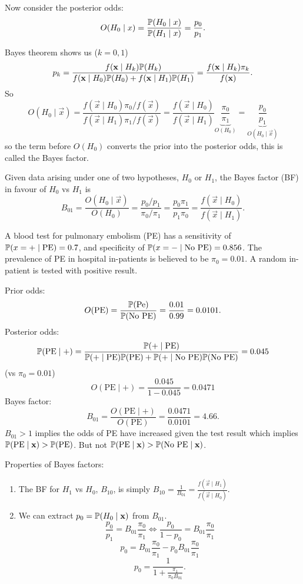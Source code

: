 \documentclass[10pt, a4paper]{article}
\begin{document}
Now consider the posterior odds:
\[
O(H_0 \mid x) = \frac{\P(H_0 \mid x)}{\P(H_1 \mid x)} = \frac{p_0}{p_1}.
\]

Bayes theorem shows us
($k = 0, 1$)
\[
p_k = \frac{f(\vec{x} \mid H_k)\P(H_k)}{f(\vec{x} \mid H_0)\P(H_0) + f(\vec{x} \mid H_1)\P(H_1)} = \frac{f(\vec{x} \mid H_k)\pi_k}{f(\vec{x})}.
\]
So
\[
O(H_0 \mid \vec{x}) = \frac{f(\vec{x} \mid H_0)\pi_0 / f(\vec{x})}{f(\vec{x} \mid H_1) \pi_1 / f(\vec{x})} = \frac{f(\vec{x} \mid H_0)}{f(\vec{x} \mid H_1)}\underbrace{\frac{\pi_0}{\pi_1}}_{O(H_0)} = \underbrace{\frac{p_0}{p_1}}_{O(H_0 \mid \vec{x})}
\]
so the term before $O(H_0)$ converts the prior into the posterior odds,
this is called the Bayes factor.

\begin{definition}
    Given data arising under one of two hypotheses,
    $H_0$ or $H_1$,
    the Bayes factor
    (BF)
    in favour of $H_0$ vs $H_1$ is
    \[
    B_{01} = \frac{O(H_0 \mid \vec{x})}{O(H_0)} = \frac{p_0 / p_1}{\pi_0 / \pi_1} = \frac{p_0\pi_1}{p_1\pi_0} = \frac{f(\vec{x} \mid H_0)}{f(\vec{x} \mid H_1)}.
    \]
\end{definition}

\begin{example}
    A blood test for pulmonary embolism
    (PE)
    has a sensitivity of $\P(x = + \mid \text{PE}) = 0.7$,
    and specificity of $\P(x = -\mid \text{No PE}) = 0.856$.
    The prevalence of PE in hospital in-patients is believed to be $\pi_0 = 0.01$.
    A random in-patient is tested with positive result.

    Prior odds:
    \[
    O(\text{PE}) = \frac{\P(\text{Pe})}{\P(\text{No PE})} = \frac{0.01}{0.99} = 0.0101.
    \]
    Posterior odds:
    \[
    \P(\text{PE} \mid +) = \frac{\P(+ \mid \text{PE})}{\P(+ \mid \text{PE})\P(\text{PE}) + \P(+ \mid \text{No PE})\P(\text{No PE})} = 0.045
    \]
    (vs $\pi_0 = 0.01$)
    \[
    O(\text{PE} \mid +) = \frac{0.045}{1 - 0.045} = 0.0471
    \]
    Bayes factor:
    \[
    B_{01} = \frac{O(\text{PE} \mid +)}{O(\text{PE})} = \frac{0.0471}{0.0101} = 4.66.
    \]
    $B_{01}> 1$ implies the odds of PE have increased given the test result which implies $\P(\text{PE} \mid \vec{x}) > \P(\text{PE})$.
    But not $\P(\text{PE} \mid \vec{x}) > \P(\text{No PE} \mid \vec{x})$.
\end{example}

Properties of Bayes factors:
\begin{enumerate}[label = (\roman*)]
    \item The BF for $H_1$ vs $H_0$,
    $B_{10}$,
    is simply $B_{10} = \frac{1}{B_{01}} = \frac{f(\vec{x} \mid H_1)}{f(\vec{x} \mid H_0)}$.

    \item We can extract $p_0 = \P(H_0 \mid \vec{x})$ from $B_{01}$.
    \[
    \frac{p_0}{p_1} = B_{01}\frac{\pi_0}{\pi_1} \iff \frac{p_0}{1 - p_0} = B_{01}\frac{\pi_0}{\pi_1}
    \]
    \[
    p_0 = B_{01}\frac{\pi_0}{\pi_1} - p_0B_{01}\frac{\pi_0}{\pi_1}
    \]
    \[
    p_0 = \frac{1}{1 + \frac{\pi_1}{\pi_0B_{01}}}.
    \]
\end{enumerate}
\end{document}
